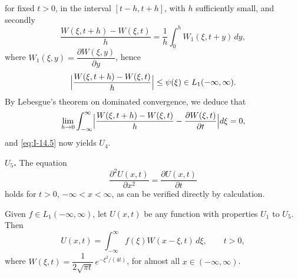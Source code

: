for fixed $t>0$, in the interval $[t-h,t+h]$, with $h$ sufficiently small, and secondly
\begin{equation*}
\frac{W(\xi,t+h)-W(\xi,t)}{h}=\frac{1}{h}\int_{0}^{h}W_1(\xi,t+y)\,dy,
\end{equation*}
where $W_1(\xi,y)=\dfrac{\partial W(\xi,y)}{\partial y}$, hence
\begin{equation*}
\Bigl|\frac{W(\xi,t+h)-W(\xi,t)}{h}\Bigr|\le\psi(\xi)\in L_1(-\infty,\infty).
\end{equation*}
By Lebesgue's theorem on dominated convergence, we deduce that
\begin{equation*}
\lim_{h\to 0}\int_{-\infty}^{\infty}\Bigl|\frac{W(\xi,t+h)-W(\xi,t)}{h}-\frac{\partial W(\xi,t)}{\partial t}\Bigr|d\xi=0,
\end{equation*}
and \eqref{eq:I-14.5} now yields $U_4$.

\noindent\textbf{$U_5$.} The equation
\begin{equation*}
\frac{\partial^{2}U(x,t)}{\partial x^{2}}=\frac{\partial U(x,t)}{\partial t}
\end{equation*}
holds for $t>0$, $-\infty<x<\infty$, as can be verified directly by calculation.

\begin{theorem}\label{thm:I-27}
Given $f\in L_1(-\infty,\infty)$, let $U(x,t)$ be any function with properties $U_1$ to $U_5$. Then
\begin{equation*}
U(x,t)=\int_{-\infty}^{\infty}f(\xi)W(x-\xi,t)\,d\xi,\qquad t>0,
\end{equation*}
where $W(\xi,t)=\dfrac{1}{2\sqrt{\pi t}}\,e^{-\xi^{2}/(4t)}$, for almost all $x\in(-\infty,\infty)$.
\end{theorem}

